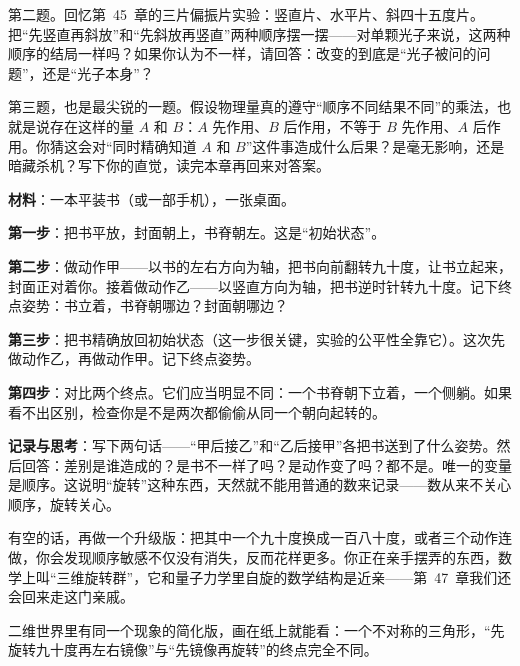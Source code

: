 第二题。回忆第~45~章的三片偏振片实验：竖直片、水平片、斜四十五度片。把“先竖直再斜放”和“先斜放再竖直”两种顺序摆一摆——对单颗光子来说，这两种顺序的结局一样吗？如果你认为不一样，请回答：改变的到底是“光子被问的问题”，还是“光子本身”？

第三题，也是最尖锐的一题。假设物理量真的遵守“顺序不同结果不同”的乘法，也就是说存在这样的量 $A$ 和 $B$：$A$ 先作用、$B$ 后作用，不等于 $B$ 先作用、$A$ 后作用。你猜这会对“同时精确知道 $A$ 和 $B$”这件事造成什么后果？是毫无影响，还是暗藏杀机？写下你的直觉，读完本章再回来对答案。


\begin{experiment}
\textbf{材料}：一本平装书（或一部手机），一张桌面。

\textbf{第一步}：把书平放，封面朝上，书脊朝左。这是“初始状态”。

\textbf{第二步}：做动作甲——以书的左右方向为轴，把书向前翻转九十度，让书立起来，封面正对着你。接着做动作乙——以竖直方向为轴，把书逆时针转九十度。记下终点姿势：书立着，书脊朝哪边？封面朝哪边？

\textbf{第三步}：把书精确放回初始状态（这一步很关键，实验的公平性全靠它）。这次先做动作乙，再做动作甲。记下终点姿势。

\textbf{第四步}：对比两个终点。它们应当明显不同：一个书脊朝下立着，一个侧躺。如果看不出区别，检查你是不是两次都偷偷从同一个朝向起转的。

\textbf{记录与思考}：写下两句话——“甲后接乙”和“乙后接甲”各把书送到了什么姿势。然后回答：差别是谁造成的？是书不一样了吗？是动作变了吗？都不是。唯一的变量是顺序。这说明“旋转”这种东西，天然就不能用普通的数来记录——数从来不关心顺序，旋转关心。
\end{experiment}

有空的话，再做一个升级版：把其中一个九十度换成一百八十度，或者三个动作连做，你会发现顺序敏感不仅没有消失，反而花样更多。你正在亲手摆弄的东西，数学上叫“三维旋转群”，它和量子力学里自旋的数学结构是近亲——第~47~章我们还会回来走这门亲戚。

二维世界里有同一个现象的简化版，画在纸上就能看：一个不对称的三角形，“先旋转九十度再左右镜像”与“先镜像再旋转”的终点完全不同。

